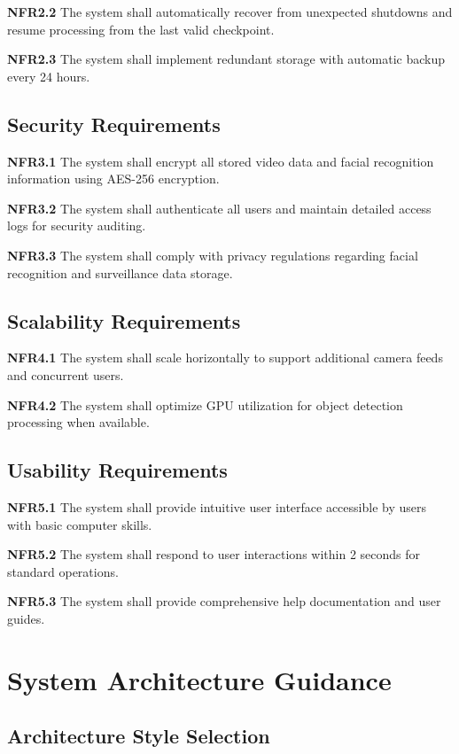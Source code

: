 \documentclass[12pt,a4paper]{article}
\begin{document}
\textbf{NFR2.2} The system shall automatically recover from unexpected shutdowns and resume processing from the last valid checkpoint.

\textbf{NFR2.3} The system shall implement redundant storage with automatic backup every 24 hours.

\subsection{Security Requirements}
\textbf{NFR3.1} The system shall encrypt all stored video data and facial recognition information using AES-256 encryption.

\textbf{NFR3.2} The system shall authenticate all users and maintain detailed access logs for security auditing.

\textbf{NFR3.3} The system shall comply with privacy regulations regarding facial recognition and surveillance data storage.

\subsection{Scalability Requirements}
\textbf{NFR4.1} The system shall scale horizontally to support additional camera feeds and concurrent users.

\textbf{NFR4.2} The system shall optimize GPU utilization for object detection processing when available.

\subsection{Usability Requirements}
\textbf{NFR5.1} The system shall provide intuitive user interface accessible by users with basic computer skills.

\textbf{NFR5.2} The system shall respond to user interactions within 2 seconds for standard operations.

\textbf{NFR5.3} The system shall provide comprehensive help documentation and user guides.

\clearpage

\section{System Architecture Guidance}

\subsection{Architecture Style Selection}
\end{document}
